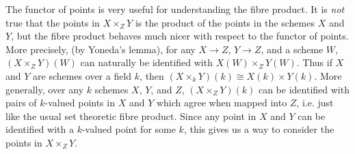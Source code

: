 The functor of points is very useful for understanding the fibre product. It is \emph{not} true that the points in $X \times_Z Y$ is the product of the points in the schemes $X$ and $Y$, but the fibre product behaves much nicer with respect to the functor of points. More precisely, (by Yoneda's lemma), for any $X \to Z$, $Y \to Z$, and a scheme $W$, $(X \times_Z Y)(W)$ can naturally be identified with $X(W) \times_Z Y(W)$. Thus if $X$ and $Y$ are schemes over a field $k$, then $(X \times_k Y)(k) \cong X(k) \times Y(k)$. More generally, over any $k$ schemes $X$, $Y$, and $Z$, $(X \times_Z Y)(k)$ can be identified with pairs of $k$-valued points in $X$ and $Y$ which agree when mapped into $Z$, i.e. just like the usual set theoretic fibre product. Since any point in $X$ and $Y$ can be identified with a $k$-valued point for some $k$, this gives us a way to consider the points in $X \times_Z Y$.


